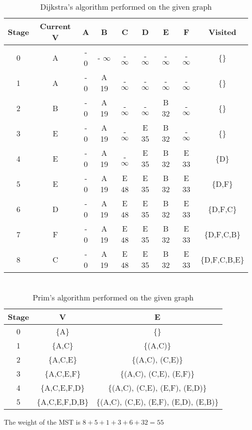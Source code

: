 \documentclass[tikz]{article}
\begin{document}
 
\begin{table}[h]
	\centering
	
	\begin{tabular}{c|c|cccccc|c}
		
		Stage& Current V & A & B & C & D & E & F & Visited\\ 
		\hline 
		0 & A & - 0 & - $\infty$ & - $\infty$ &- $\infty$  &- $\infty$  &- $\infty$  &\{\}\\ 
		1 & A & - 0 & A 19 & - $\infty$ & - $\infty$ &- $\infty$  &- $\infty$ & \{\}\\
		2 & B & - 0 & A 19 & - $\infty$ & - $\infty$ & B 32 & - $\infty$ & \{\} \\
		3 & E & - 0 & A 19 & - $\infty$ & E 35 & B 32 & - $\infty$ & \{\} \\
		4 & E & - 0 & A 19 & - $\infty$ & E 35 & B 32 & E 33  & \{D\}\\
		5 & E & - 0 & A 19 & E 48 & E 35 & B 32 & E 33 & \{D,F\} \\
		6 & D & - 0 & A 19 & E 48 & E 35 & B 32 & E 33 & \{D,F,C\} \\
		7 & F &  - 0 & A 19 & E 48 & E 35 & B 32 & E 33  & \{D,F,C,B\}\\
		8 & C & - 0 & A 19 & E 48 & E 35 & B 32 & E 33  & \{D,F,C,B,E\} \\
		
	\end{tabular} 
	
	\caption{Dijkstra's algorithm performed on the given graph}
\end{table}

\section{}
\subsection{}
\begin{table}[h]
	\centering
	
	\begin{tabular}{c|c|c}
		
		Stage& V & E \\ 
		\hline 
		0 & \{A\} & \{\} \\
		1 & \{A,C\} & \{(A,C)\} \\
		2 & \{A,C,E\} & \{(A,C), (C,E)\} \\
		3 & \{A,C,E,F\} & \{(A,C), (C,E), (E,F)\}\\
		4 & \{A,C,E,F,D\} & \{(A,C), (C,E), (E,F), (E,D)\}\\
		5 & \{A,C,E,F,D,B\} & \{(A,C), (C,E), (E,F), (E,D), (E,B)\}
		
		
	\end{tabular} 
	
	\caption{Prim's algorithm performed on the given graph}
\end{table}
The weight of the MST is $8+5+1+3+6+32=55$
\end{document}
